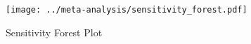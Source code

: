 \begin{figure}[p]
\centering

\texttt{[image: ../meta-analysis/sensitivity\_forest.pdf]}

\caption[Sensitivity Forest Plot]{Sensitivity Forest Plot}
\label{fig:sensitivity_forest}
\end{figure}
